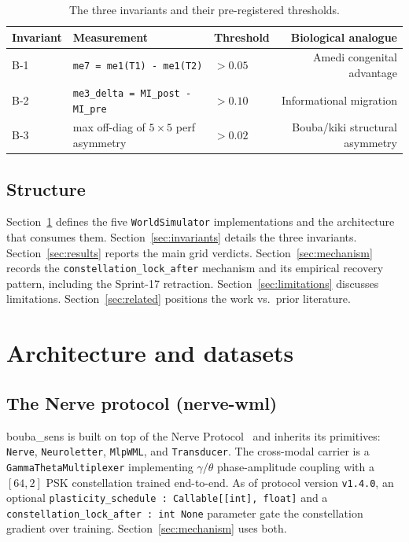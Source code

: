 \documentclass{article}
\begin{document}
\begin{table}[t]
  \centering
  \caption{The three invariants and their pre-registered thresholds.}
  \label{tab:invariants}
  \begin{tabular}{lllr}
    \toprule
    Invariant & Measurement & Threshold & Biological analogue \\
    \midrule
    B-1 & \texttt{me7 = me1(T1) - me1(T2)} & $>0.05$ & Amedi congenital advantage \\
    B-2 & \texttt{me3\_delta = MI\_post - MI\_pre} & $>0.10$ & Informational migration \\
    B-3 & max off-diag of $5\times5$ perf asymmetry & $>0.02$ & Bouba/kiki structural asymmetry \\
    \bottomrule
  \end{tabular}
\end{table}

\subsection{Structure}

Section~\ref{sec:architecture} defines the five
\texttt{WorldSimulator} implementations and the architecture that
consumes them. Section~\ref{sec:invariants} details the three
invariants. Section~\ref{sec:results} reports the main grid
verdicts. Section~\ref{sec:mechanism} records the
\texttt{constellation\_lock\_after} mechanism and its empirical
recovery pattern, including the Sprint-17 retraction.
Section~\ref{sec:limitations} discusses limitations.
Section~\ref{sec:related} positions the work vs.\ prior literature.


\section{Architecture and datasets}
\label{sec:architecture}

\subsection{The Nerve protocol (nerve-wml)}

bouba\_sens is built on top of the Nerve
Protocol~\citep{saillant2026nervewml} and inherits its primitives:
\texttt{Nerve}, \texttt{Neuroletter}, \texttt{MlpWML}, and
\texttt{Transducer}. The cross-modal carrier is a
\texttt{GammaThetaMultiplexer} implementing $\gamma/\theta$
phase-amplitude coupling \citep{lisman1995storage,
tort2010measuring, colgin2016rhythms} with a $[64, 2]$ PSK
constellation trained end-to-end. As of protocol version
\texttt{v1.4.0}, an optional
\texttt{plasticity\_schedule : Callable[[int], float]} and a
\texttt{constellation\_lock\_after : int \textbar{} None} parameter
gate the constellation gradient over training.
Section~\ref{sec:mechanism} uses both.
\end{document}
